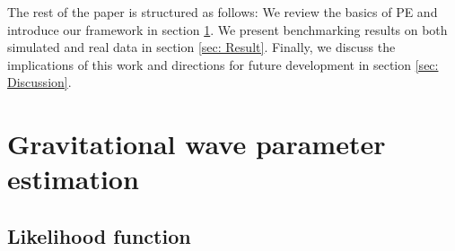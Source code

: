 \documentclass[twocolumn]{aastex631}
\begin{document}

The rest of the paper is structured as follows: We review the basics of PE and
introduce our framework in section \ref{sec: PE}. We present benchmarking
results on both simulated and real data in section \ref{sec: Result}. Finally,
we discuss the implications of this work and directions for future development
in section \ref{sec: Discussion}.

\section{Gravitational wave parameter estimation}
\label{sec: PE}

\subsection{Likelihood function}
\label{sec:likelihood}
\end{document}
